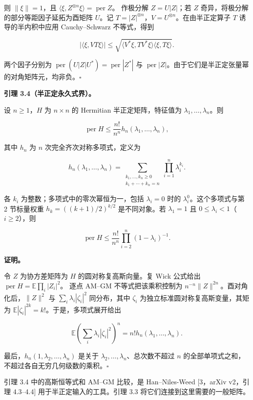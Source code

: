 \documentclass[11pt,a4paper]{article}
\begin{document}
则 \(\|\xi\|=1\)，且 \(\langle\xi,Z^{\otimes n}\xi\rangle=\operatorname{per}Z\)。 作极分解 \(Z=U|Z|\)；若 \(Z\) 奇异，将极分解的部分等距因子延拓为酉矩阵 \(U\)。记 \(T=|Z|^{\otimes n}\)，\(V=U^{\otimes n}\)。在由半正定算子 \(T\) 诱导的半内积中应用 Cauchy--Schwarz 不等式，得到

\[|\langle\xi,VT\xi\rangle|
\le\sqrt{\langle V^*\xi,TV^*\xi\rangle
\langle\xi,T\xi\rangle}.\]

两个因子分别为 \(\operatorname{per}(U|Z|U^*)=\operatorname{per}|Z^*|\) 与 \(\operatorname{per}|Z|\)。由于它们是半正定张量幂的对角矩阵元，均非负。\(\square\)

\textbf{引理 3.4（半正定永久式界）。}

设 \(n\ge1\)，\(H\) 为 \(n\times n\) 的 Hermitian 半正定矩阵，特征值为 \(\lambda_1,\ldots,\lambda_n\)。则

\[\operatorname{per}H\le\frac{n!}{n^n}h_n(\lambda_1,\ldots,\lambda_n),\]

其中 \(h_n\) 为 \(n\) 次完全齐次对称多项式，定义为

\[h_n(\lambda_1,\ldots,\lambda_n)
=\sum_{\substack{k_1,\ldots,k_n\ge0\\k_1+\cdots+k_n=n}}
\prod_{i=1}^n\lambda_i^{k_i}.\]

各 \(k_i\) 为整数；多项式中的零次幂恒为一，包括 \(\lambda_i=0\) 时的 \(\lambda_i^0\)。这个多项式与第 2 节标量权重 \(h_k=((k+1)/2)^{k/2}\) 是不同对象。若 \(\lambda_1=1\) 且 \(0\le\lambda_i<1\)（\(i\ge2\)），则

\[\operatorname{per}H\le\frac{n!}{n^n}
\prod_{i=2}^n(1-\lambda_i)^{-1}.\]

\textbf{证明。}

令 \(Z\) 为协方差矩阵为 \(H\) 的圆对称复高斯向量。复 Wick 公式给出 \(\operatorname{per}H=\mathbb E\prod_i|Z_i|^2\)。 逐点 AM--GM 不等式把该乘积控制为 \(n^{-n}\|Z\|^{2n}\)。酉对角化后，\(\|Z\|^2\) 与 \(\sum_i\lambda_i|\zeta_i|^2\) 同分布，其中 \(\zeta_i\) 为独立标准圆对称复高斯变量，其矩为 \(\mathbb E|\zeta_i|^{2k}=k!\)。于是，多项式展开给出

\[\mathbb E\left(\sum_i\lambda_i|\zeta_i|^2\right)^n
=n!h_n(\lambda_1,\ldots,\lambda_n).\]

最后，\(h_n(1,\lambda_2,\ldots,\lambda_n)\) 是关于 \(\lambda_2,\ldots,\lambda_n\)、总次数不超过 \(n\) 的全部单项式之和，不超过各自无穷几何级数的乘积。\(\square\)

引理 3.4 中的高斯恒等式和 AM--GM 比较，是 Han--Niles-Weed {[}3，arXiv v2，引理 4.3--4.4{]} 用于半正定输入的工具。引理 3.3 将它们连接到这里需要的一般矩阵。
\end{document}
